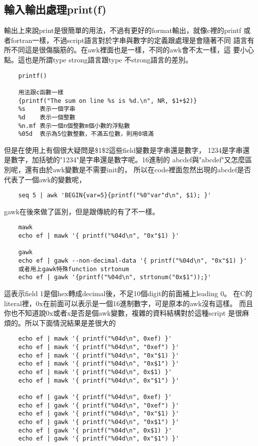    \subsection{輸入輸出處理print(f)}
    輸出上來說print是很簡單的用法，不過有更好的format輸出，就像c裡的printf
    或者fortran一樣，不過script語言對於字串與數字的定義跟處理是會隨著不同
    語言有所不同這是很傷腦筋的。在awk裡面也是一樣，不同的awk會不太一樣，這
    要小心點。這也是所謂type strong語言跟type 不strong語言的差別。
    \begin{verbatim}
    printf()

    用法跟c函數一樣
    {printf("The sum on line %s is %d.\n", NR, $1+$2)}
    %s    表示一個字串
    %d    表示一個整數
    %n.mf 表示一個n個整數m個小數的浮點數
    %05d  表示為5位數整數，不滿五位數，則用0填滿
    \end{verbatim}
    但是在使用上有個很大疑問是\$1\$2這些field變數是字串還是數字，
    1234是字串還是數字，加括號的"1234"是字串還是數字呢。16進制的
    abcdef與"abcdef"又怎麼區別呢，還有由於awk變數是不需要init的，
    所以在code裡面忽然出現的abcdef是否代表了一個awk的變數呢，
    \begin{verbatim}
    seq 5 | awk 'BEGIN{var=5}{printf("%0"var"d\n", $1); }'
    \end{verbatim}
    gawk在後來做了區別，但是跟傳統的有了不一樣。
    \begin{verbatim}
    mawk
    echo ef | mawk '{ printf("%04d\n", "0x"$1) }'

    gawk
    echo ef | gawk --non-decimal-data '{ printf("%04d\n", "0x"$1) }'
    或者用上gawk特殊function strtonum
    echo ef | gawk '{printf("%04d\n", strtonum("0x$1"));}'
    \end{verbatim}
    這表示field 1是個hex轉成decimal後，不足10個digit的前面補上leading 0。
    在C的literal裡，0x在前面可以表示是一個16進制數字，可是原本的awk沒有這樣。
    而且你也不知道說0x或者x是否是個awk變數，複雜的資料結構對於這種script
    是很麻煩的。所以下面情況結果是差很大的
    \begin{verbatim}
    echo ef | mawk '{ printf("%04d\n", 0xef) }'
    echo ef | mawk '{ printf("%04d\n", "0xef") }'
    echo ef | mawk '{ printf("%04d\n", "0x"$1) }'
    echo ef | mawk '{ printf("%04d\n", "0x$1") }'
    echo ef | mawk '{ printf("%04d\n", 0x$1) }'
    echo ef | mawk '{ printf("%04d\n", 0x"$1") }'

    echo ef | gawk '{ printf("%04d\n", 0xef) }'
    echo ef | gawk '{ printf("%04d\n", "0xef") }'
    echo ef | gawk '{ printf("%04d\n", "0x"$1) }'
    echo ef | gawk '{ printf("%04d\n", "0x$1") }'
    echo ef | gawk '{ printf("%04d\n", 0x$1) }'
    echo ef | gawk '{ printf("%04d\n", 0x"$1") }'
    \end{verbatim}

